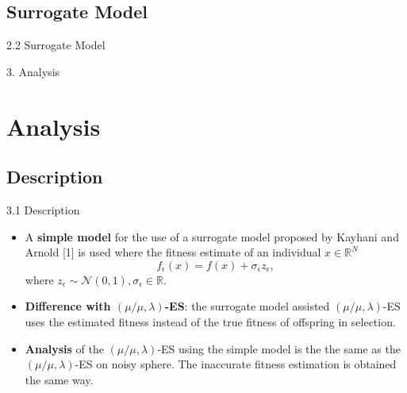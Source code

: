 \documentclass{beamer}
\begin{document}
\subsection{Surrogate Model}

\begin{frame}{2.2 Surrogate Model}


\end{frame}


\begin{frame}[plain,c]
\begin{center}
\Huge 3. Analysis
\end{center}
\end{frame}
\section{Analysis}
\subsection{Description}
\begin{frame}{3.1 Description}

\begin{itemize}
\item A \textbf{simple model} for the use of a surrogate model proposed by Kayhani and Arnold [1] is used where the fitness estimate of an individual $x\in \mathbb{R}^N$ $$f_\epsilon(x) = f(x)+\sigma_\epsilon z_\epsilon,$$
where $z_\epsilon \sim \mathcal{N}(0,1), \sigma_\epsilon \in \mathbb{R}. $

\item \textbf{Difference with $(\mu/\mu,\lambda)$-ES}: the surrogate model assisted $(\mu/\mu,\lambda)$-ES uses the estimated fitness instead of the true fitness of offspring in selection. 

\item \textbf{Analysis} of the $(\mu/\mu,\lambda)$-ES using the simple model is the the same as the $(\mu/\mu,\lambda)$-ES on noisy sphere. The inaccurate fitness estimation is obtained the same way.
\end{itemize}


\end{frame}
\end{document}
